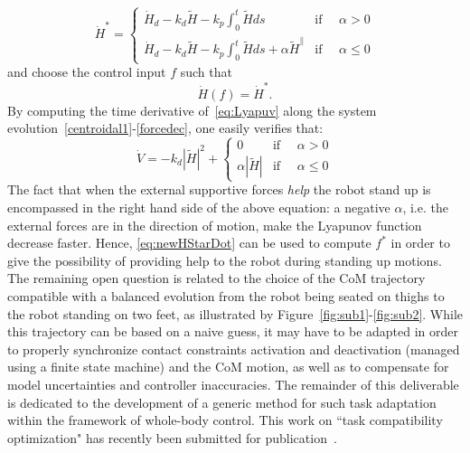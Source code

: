 \documentclass[12pt,a4paper,twoside]{article}
\begin{document}
\begin{equation}
\label{eq:newHStarDot}
  \dot{H}^* =
  \begin{cases}
    \dot{H}_d - k_d\tilde{H} -k_p \int_0^t\tilde{H} ds & \text{if }\quad  \alpha > 0
    \\
   \dot{H}_d - k_d\tilde{H} -k_p \int_0^t\tilde{H} ds +\alpha\tilde{H}^\parallel & \text{if }\quad  \alpha \leq 0
  \end{cases}
\end{equation}
and choose the control input $f$ such that 
\[ \dot{H}(f) = \dot{H}^*. \]
By computing the time derivative of~\eqref{eq:Lyapuv} along the system evolution~\eqref{centroidal1}-\eqref{forcedec}, one easily verifies that:
\begin{equation}
\label{eq:newVDot}
 \dot{V} =-k_d|\tilde{H}|^2 +
  \begin{cases}
   0 & \text{if }\quad  \alpha > 0
    \\
   \alpha|\tilde{H}| & \text{if }\quad  \alpha \leq 0
  \end{cases}
\end{equation}
The fact that when the external supportive forces \emph{help} the robot stand up is encompassed in the right hand side of the above equation:  a negative $\alpha$, i.e. the external forces are in the direction of motion, make the Lyapunov function decrease faster. Hence, \eqref{eq:newHStarDot} can be used to compute $f^*$ in order to give the possibility of providing help to the robot during standing up motions.\\

The remaining open question is related to the choice of the CoM trajectory compatible with a balanced evolution from the robot being seated on  thighs to the robot standing on two feet, as illustrated by Figure~\ref{fig:sub1}-\ref{fig:sub2}. While this trajectory can be based on a naive guess, it may have to be adapted in order to properly synchronize contact constraints activation and deactivation (managed using a finite state machine) and the CoM motion, as well as to compensate for model uncertainties and controller inaccuracies. The remainder of this deliverable is dedicated to the development of a generic method for such task adaptation within the framework of whole-body control. This work on ``task compatibility optimization" has recently been submitted for publication~\cite{lober2017RAL-IROS}.
\end{document}
